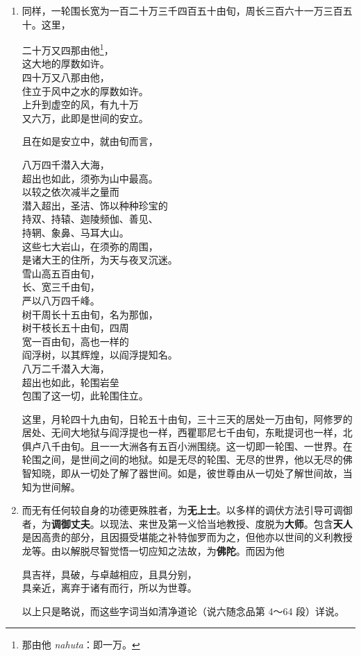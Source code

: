 \begin{enumerate}
\item 同样，一轮围长宽为一百二十万三千四百五十由旬，周长三百六十一万三百五十。这里，\begin{quoting}二十万又四那由他\footnote{那由他 \textit{nahuta}：即一万。}，\\这大地的厚数如许。\\四十万又八那由他，\\住立于风中之水的厚数如许。\\上升到虚空的风，有九十万\\又六万，此即是世间的安立。\end{quoting}且在如是安立中，就由旬而言，\begin{quoting}八万四千潜入大海，\\超出也如此，须弥为山中最高。\\以较之依次减半之量而\\潜入超出，圣洁、饰以种种珍宝的\\持双、持辕、迦陵频伽、善见、\\持辋、象鼻、马耳大山。\\这些七大岩山，在须弥的周围，\\是诸大王的住所，为天与夜叉沉迷。\\雪山高五百由旬，\\长、宽三千由旬，\\严以八万四千峰。\\树干周长十五由旬，名为那伽，\\树干枝长五十由旬，四周\\宽一百由旬，高也一样的\\阎浮树，以其辉煌，以阎浮提知名。\\八万二千潜入大海，\\超出也如此，轮围岩垒\\包围了这一切，此轮围住立。\end{quoting}这里，月轮四十九由旬，日轮五十由旬，三十三天的居处一万由旬，阿修罗的居处、无间大地狱与阎浮提也一样，西瞿耶尼七千由旬，东毗提诃也一样，北俱卢八千由旬。且一一大洲各有五百小洲围绕。这一切即一轮围、一世界。在轮围之间，是世间之间的地狱。如是无尽的轮围、无尽的世界，他以无尽的佛智知晓，即从一切处了解了器世间。如是，彼世尊由从一切处了解世间故，当知为世间解。
\item 而无有任何较自身的功德更殊胜者，为\textbf{无上士}。以多样的调伏方法引导可调御者，为\textbf{调御丈夫}。以现法、来世及第一义恰当地教授、度脱为\textbf{大师}。包含\textbf{天人}是因高贵的部分，且因摄受堪能之补特伽罗而为之，但他亦以世间的义利教授龙等。由以解脱尽智觉悟一切应知之法故，为\textbf{佛陀}。而因为他\begin{quoting}具吉祥，具破，与卓越相应，且具分别，\\具亲近，离弃于诸有而行，所以为世尊。\end{quoting}以上只是略说，而这些字词当如清净道论（说六随念品第 4～64 段）详说。

\end{enumerate}
